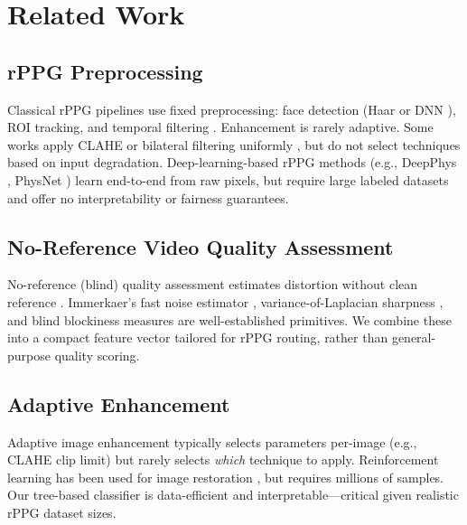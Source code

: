 \documentclass[conference]{IEEEtran}
\begin{document}
\section{Related Work}
\label{sec:related}

\subsection{rPPG Preprocessing}
\label{subsec:related_preproc}

Classical rPPG pipelines use fixed preprocessing: face detection (Haar \cite{viola2001robust} or DNN \cite{zhang2016joint}), ROI tracking, and temporal filtering \cite{de2013robust}. Enhancement is rarely adaptive. Some works apply CLAHE or bilateral filtering uniformly \cite{lewandowska2012measuring}, but do not select techniques based on input degradation. Deep-learning-based rPPG methods (e.g., DeepPhys \cite{chen2018deepphys}, PhysNet \cite{yu2019remote}) learn end-to-end from raw pixels, but require large labeled datasets and offer no interpretability or fairness guarantees.

\subsection{No-Reference Video Quality Assessment}
\label{subsec:related_nrqa}

No-reference (blind) quality assessment estimates distortion without clean reference \cite{mittal2012making}. Immerkaer's fast noise estimator \cite{immerkaer1996fast}, variance-of-Laplacian sharpness \cite{pech2000diatom}, and blind blockiness measures \cite{wang2000blind} are well-established primitives. We combine these into a compact feature vector tailored for rPPG routing, rather than general-purpose quality scoring.

\subsection{Adaptive Enhancement}
\label{subsec:related_adaptive}

Adaptive image enhancement typically selects parameters per-image (e.g., CLAHE clip limit) but rarely selects \emph{which} technique to apply. Reinforcement learning has been used for image restoration \cite{yu2018crafting}, but requires millions of samples. Our tree-based classifier is data-efficient and interpretable---critical given realistic rPPG dataset sizes.
\end{document}
